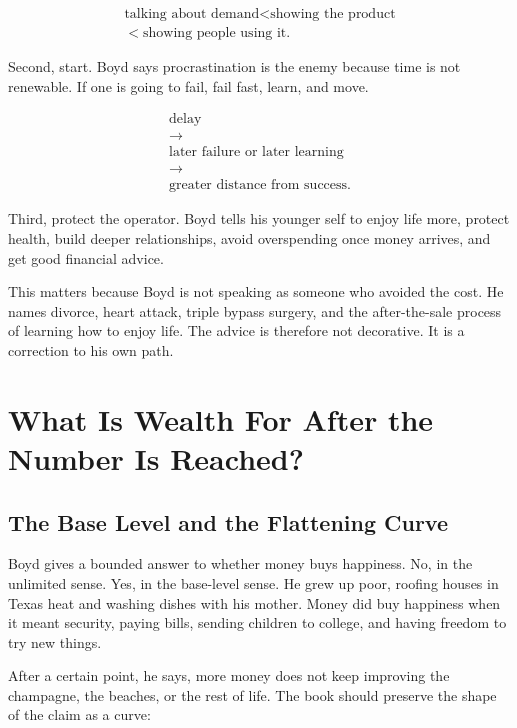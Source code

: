 \documentclass[11pt,oneside]{book}
\begin{document}
\begin{equation}
\begin{gathered}
\text{talking about demand}<\text{showing the product}\\
<\text{showing people using it}.
\end{gathered}
\end{equation}

Second, start. Boyd says procrastination is the enemy because time is not renewable. If one is going to fail, fail fast, learn, and move.

\begin{equation}
\begin{gathered}
\text{delay}\\
\longrightarrow\\
\text{later failure or later learning}\\
\longrightarrow\\
\text{greater distance from success}.
\end{gathered}
\end{equation}

Third, protect the operator. Boyd tells his younger self to enjoy life more, protect health, build deeper relationships, avoid overspending once money arrives, and get good financial advice.

This matters because Boyd is not speaking as someone who avoided the cost. He names divorce, heart attack, triple bypass surgery, and the after-the-sale process of learning how to enjoy life. The advice is therefore not decorative. It is a correction to his own path.

\chapter{What Is Wealth For After the Number Is Reached?}

\section{The Base Level and the Flattening Curve}

Boyd gives a bounded answer to whether money buys happiness. No, in the unlimited sense. Yes, in the base-level sense. He grew up poor, roofing houses in Texas heat and washing dishes with his mother. Money did buy happiness when it meant security, paying bills, sending children to college, and having freedom to try new things.

After a certain point, he says, more money does not keep improving the champagne, the beaches, or the rest of life. The book should preserve the shape of the claim as a curve:
\end{document}
